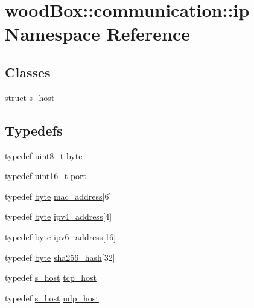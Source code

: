 \hypertarget{namespacewood_box_1_1communication_1_1ip}{}\section{wood\+Box\+:\+:communication\+:\+:ip Namespace Reference}
\label{namespacewood_box_1_1communication_1_1ip}
\subsection*{Classes}
\begin{DoxyCompactItemize}
\item 
struct \mbox{\hyperlink{structwood_box_1_1communication_1_1ip_1_1s__host}{s\+\_\+host}}
\end{DoxyCompactItemize}
\subsection*{Typedefs}
\begin{DoxyCompactItemize}
\item 
typedef uint8\+\_\+t \mbox{\hyperlink{namespacewood_box_1_1communication_1_1ip_af1b00b9755ebc1bbeb6b5be2068bb421}{byte}}
\item 
typedef uint16\+\_\+t \mbox{\hyperlink{namespacewood_box_1_1communication_1_1ip_a60d560dd3f44a2de58c7e8209e94e345}{port}}
\item 
typedef \mbox{\hyperlink{namespacewood_box_1_1communication_1_1ip_af1b00b9755ebc1bbeb6b5be2068bb421}{byte}} \mbox{\hyperlink{namespacewood_box_1_1communication_1_1ip_a77e0ff862f91fee5e1885c9f05c2439e}{mac\+\_\+address}}\mbox{[}6\mbox{]}
\item 
typedef \mbox{\hyperlink{namespacewood_box_1_1communication_1_1ip_af1b00b9755ebc1bbeb6b5be2068bb421}{byte}} \mbox{\hyperlink{namespacewood_box_1_1communication_1_1ip_afb5b3a2d174b71ebd2753541752aee47}{ipv4\+\_\+address}}\mbox{[}4\mbox{]}
\item 
typedef \mbox{\hyperlink{namespacewood_box_1_1communication_1_1ip_af1b00b9755ebc1bbeb6b5be2068bb421}{byte}} \mbox{\hyperlink{namespacewood_box_1_1communication_1_1ip_a2b9a62d13acf84460a39258276c520a5}{ipv6\+\_\+address}}\mbox{[}16\mbox{]}
\item 
typedef \mbox{\hyperlink{namespacewood_box_1_1communication_1_1ip_af1b00b9755ebc1bbeb6b5be2068bb421}{byte}} \mbox{\hyperlink{namespacewood_box_1_1communication_1_1ip_adcec1f9c48ea7ea4e2c4ff86c00fc130}{sha256\+\_\+hash}}\mbox{[}32\mbox{]}
\item 
typedef \mbox{\hyperlink{structwood_box_1_1communication_1_1ip_1_1s__host}{s\+\_\+host}} \mbox{\hyperlink{namespacewood_box_1_1communication_1_1ip_a09f6bd2ea2cdc975714c7957cd7f1c88}{tcp\+\_\+host}}
\item 
typedef \mbox{\hyperlink{structwood_box_1_1communication_1_1ip_1_1s__host}{s\+\_\+host}} \mbox{\hyperlink{namespacewood_box_1_1communication_1_1ip_a8527df0a5c8ea4da43a00cbf370b9299}{udp\+\_\+host}}
\end{DoxyCompactItemize}
